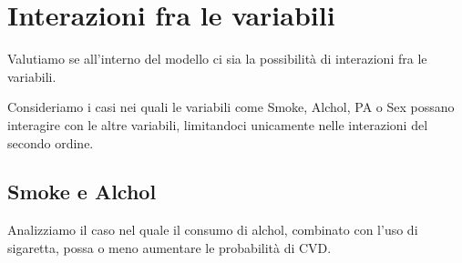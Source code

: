 \documentclass{article}\usepackage[]{graphicx}\usepackage[]{xcolor}
\begin{document}
\clearpage

\section{Interazioni fra le variabili}
  Valutiamo se all'interno del modello ci sia la possibilità di interazioni
  fra le variabili. \par
  Consideriamo i casi nei quali le variabili come Smoke, Alchol, PA o Sex possano 
  interagire con le altre variabili, limitandoci unicamente nelle interazioni 
  del secondo ordine.
  
  \subsection{Smoke e Alchol}
  Analizziamo il caso nel quale il consumo di alchol, combinato con l'uso di 
  sigaretta, possa o meno aumentare le probabilità di CVD.
  
\end{document}

